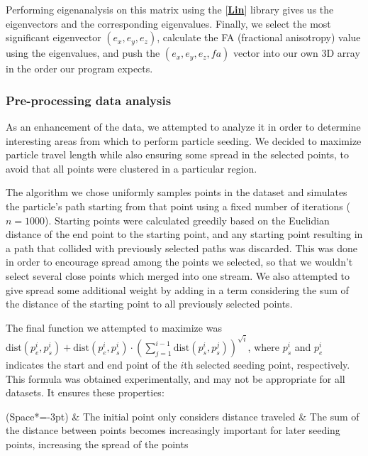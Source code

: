 \documentclass{article}
\newcommand{\code}[1]{\fcolorbox{codebd}{codebg}{\lstinline[basicstyle=\ttfamily\color{codefg}]{#1}}}
\newcommand{\reference}[1]{[\hyperref[ref:#1]{\textbf{#1}}]}
\begin{document}
Performing eigenanalysis on this matrix using the \code{nalgebra} \reference{Lin} library gives us the eigenvectors and the corresponding eigenvalues. Finally, we select the most significant eigenvector \((e_x,e_y,e_z)\), calculate the FA (fractional anisotropy) value using the eigenvalues, and push the \((e_x, e_y, e_z, fa)\) vector into our own 3D array in the order our program expects.


\subsubsection*{Pre-processing data analysis}\label{sec:prepro}

As an enhancement of the data, we attempted to analyze it in order to determine interesting areas from which to perform particle seeding. We decided to maximize particle travel length while also ensuring some spread in the selected points, to avoid that all points were clustered in a particular region.

The algorithm we chose uniformly samples points in the dataset and simulates the particle's path starting from that point using a fixed number of iterations (\(n = 1000\)). Starting points were calculated greedily based on the Euclidian distance of the end point to the starting point, and any starting point resulting in a path that collided with previously selected paths was discarded. This was done in order to encourage spread among the points we selected, so that we wouldn't select several close points which merged into one stream. We also attempted to give spread some additional weight by adding in a term considering the sum of the distance of the starting point to all previously selected points.

The final function we attempted to maximize was \(\textrm{dist}(p_e^i, p_s^i) + \textrm{dist}(p_e^i, p_s^i)\cdot{(\sum_{j=1}^{i-1}{\textrm{dist}(p_s^i, p_s^j)})}^{\sqrt{i}}\), where \(p_s^i\) and \(p_e^i\) indicates the start and end point of the \(i\)th selected seeding point, respectively. This formula was obtained experimentally, and may not be appropriate for all datasets. It ensures these properties:

\begin{easylist}[itemize]
\ListProperties(Space*=-3pt)
& The initial point only considers distance traveled
& The sum of the distance between points becomes increasingly important for later seeding points, increasing the spread of the points
\end{easylist}
\end{document}

